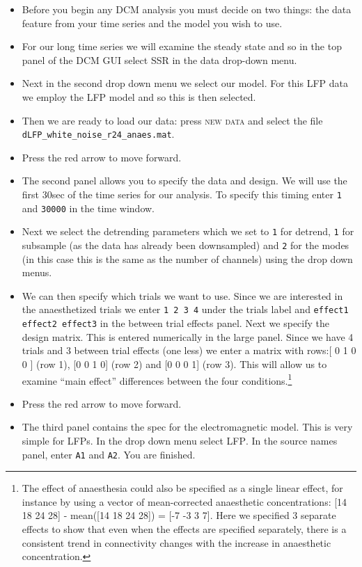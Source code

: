 \begin{itemize}
\item Before you begin any DCM analysis you must decide on two things: the data feature from your time series and the model you wish to use.
\item For our long time series we will examine the steady state and so in the top panel of the DCM GUI select \textsc{SSR} in the data drop-down menu.
\item Next in the second drop down menu we select our model. For this LFP data we employ the \textsc{LFP} model and so this is then selected. 
\item Then we are ready to load our data: press \textsc{new data} and select the file \texttt{dLFP\_white\_noise\_r24\_anaes.mat}.
\item Press the red arrow to move forward.
\item The second panel allows you to specify the data and design. We will use the first 30sec of the time series for our analysis. To specify this timing enter \texttt{1} and \texttt{30000} in the time window.
\item Next we select the detrending parameters which we set to \texttt{1} for detrend, \texttt{1} for subsample (as the data has already been downsampled) and \texttt{2} for the modes (in this case this is the same as the number of channels) using the drop down menus.
\item We can then specify which trials we want to use. Since we are interested in the anaesthetized trials we enter \texttt{1 2 3 4} under the trials label and \texttt{effect1 effect2 effect3} in the between trial effects panel. Next we specify the design matrix. This is entered numerically in the large panel. Since we have 4 trials and 3 between trial effects (one less) we enter a matrix with rows:[ 0 1 0 0 ] (row 1), [0 0 1 0] (row 2) and [0 0 0 1] (row 3). This will allow us to examine ``main effect'' differences between the four conditions.\footnote{The effect of anaesthesia could also be specified as a single linear effect, for instance by using a vector of mean-corrected anaesthetic concentrations: [14 18 24 28] - mean([14 18 24 28]) = [-7 -3 3 7]. Here we specified 3 separate effects to show that even when the effects are specified separately, there is a consistent trend in connectivity changes with the increase in anaesthetic concentration.}
\item Press the red arrow to move forward.
\item The third panel contains the spec for the electromagnetic model. This is very simple for LFPs. In the drop down menu select \textsc{LFP}. In the source names panel, enter \texttt{A1} and \texttt{A2}. You are finished.

\end{itemize}
